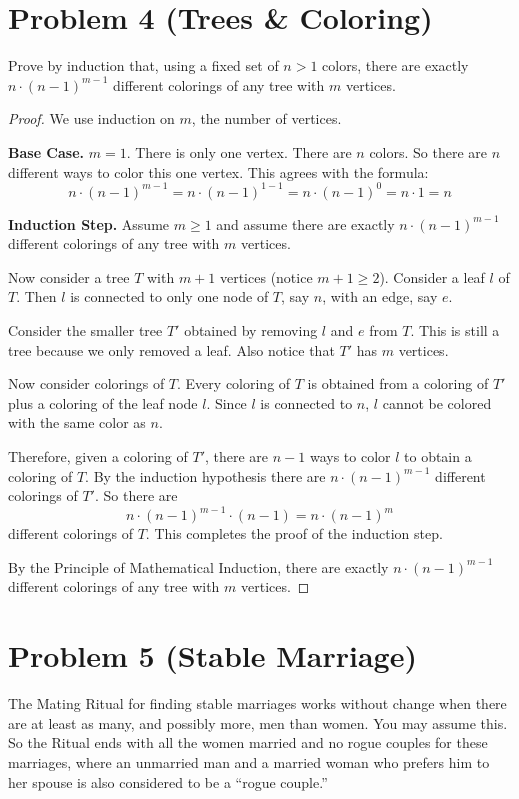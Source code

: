 \documentclass[14pt]{extarticle}
\begin{document}
\section{Problem 4 (Trees \& Coloring)}
Prove by induction that, using a fixed set of $n > 1$ colors, there are exactly $n\cdot(n-1)^{m-1}$ different colorings of any tree with $m$ vertices.
\begin{proof}
We use induction on $m$, the number of vertices.

{\bf Base Case.} $m = 1$. There is only one vertex. There are $n$ colors. So there are $n$ different ways to color this one vertex. This agrees with the formula:
$$
n\cdot(n-1)^{m-1} = n\cdot(n-1)^{1-1} = n\cdot(n-1)^{0} = n \cdot 1 = n
$$

{\bf Induction Step.} Assume $m \geq 1$ and assume there are exactly $n\cdot(n-1)^{m-1}$ different colorings of any tree with $m$ vertices.

Now consider a tree $T$ with $m+1$ vertices (notice $m+1 \geq 2$). Consider a leaf $l$ of $T$. Then $l$ is connected to only one node of $T$, say $n$, with an edge, say $e$. 

Consider the smaller tree $T'$ obtained by removing $l$ and $e$ from $T$. This is still a tree because we only removed a leaf. Also notice that $T'$ has $m$ vertices. 

Now consider colorings of $T$. Every coloring of $T$ is obtained from a coloring of $T'$ plus a coloring of the leaf node $l$. Since $l$ is connected to $n$, $l$ cannot be colored with the same color as $n$. 

Therefore, given a coloring of $T'$, there are $n-1$ ways to color $l$ to obtain a coloring of $T$. By the induction hypothesis there are $n\cdot(n-1)^{m-1}$ different colorings of $T'$. So there are 
$$
n\cdot(n-1)^{m-1} \cdot (n-1) = n\cdot(n-1)^{m}
$$ 
different colorings of $T$. This completes the proof of the induction step. 

By the Principle of Mathematical Induction, there are exactly $n\cdot(n-1)^{m-1}$ different colorings of any tree with $m$ vertices.
\end{proof}

\section{Problem 5 (Stable Marriage)}
The Mating Ritual for finding stable marriages works without change when there are at least as many, and possibly more, men than women. You may assume this. So the Ritual ends with all the women married and
no rogue couples for these marriages, where an unmarried man and a married woman who prefers him to her spouse is also considered to be a ``rogue couple.''
\end{document}
